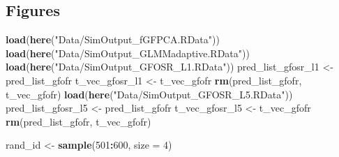 \documentclass[
]{article}
\newenvironment{Shaded}{\begin{snugshade}}{\end{snugshade}}
\newcommand{\AttributeTok}[1]{\textcolor[rgb]{0.13,0.29,0.53}{#1}}
\newcommand{\DecValTok}[1]{\textcolor[rgb]{0.00,0.00,0.81}{#1}}
\newcommand{\FunctionTok}[1]{\textcolor[rgb]{0.13,0.29,0.53}{\textbf{#1}}}
\newcommand{\NormalTok}[1]{#1}
\newcommand{\OtherTok}[1]{\textcolor[rgb]{0.56,0.35,0.01}{#1}}
\newcommand{\SpecialCharTok}[1]{\textcolor[rgb]{0.81,0.36,0.00}{\textbf{#1}}}
\newcommand{\StringTok}[1]{\textcolor[rgb]{0.31,0.60,0.02}{#1}}
\begin{document}
\subsection{Figures}\label{figures}

\begin{Shaded}
\begin{Highlighting}[]
\FunctionTok{load}\NormalTok{(}\FunctionTok{here}\NormalTok{(}\StringTok{"Data/SimOutput\_fGFPCA.RData"}\NormalTok{))}
\FunctionTok{load}\NormalTok{(}\FunctionTok{here}\NormalTok{(}\StringTok{"Data/SimOutput\_GLMMadaptive.RData"}\NormalTok{))}
\FunctionTok{load}\NormalTok{(}\FunctionTok{here}\NormalTok{(}\StringTok{"Data/SimOutput\_GFOSR\_L1.RData"}\NormalTok{))}
\NormalTok{pred\_list\_gfosr\_l1 }\OtherTok{\textless{}{-}}\NormalTok{ pred\_list\_gfofr}
\NormalTok{t\_vec\_gfosr\_l1 }\OtherTok{\textless{}{-}}\NormalTok{ t\_vec\_gfofr}
\FunctionTok{rm}\NormalTok{(pred\_list\_gfofr, t\_vec\_gfofr)}
\FunctionTok{load}\NormalTok{(}\FunctionTok{here}\NormalTok{(}\StringTok{"Data/SimOutput\_GFOSR\_L5.RData"}\NormalTok{))}
\NormalTok{pred\_list\_gfosr\_l5 }\OtherTok{\textless{}{-}}\NormalTok{ pred\_list\_gfofr}
\NormalTok{t\_vec\_gfosr\_l5 }\OtherTok{\textless{}{-}}\NormalTok{ t\_vec\_gfofr}
\FunctionTok{rm}\NormalTok{(pred\_list\_gfofr, t\_vec\_gfofr)}

\NormalTok{rand\_id }\OtherTok{\textless{}{-}} \FunctionTok{sample}\NormalTok{(}\DecValTok{501}\SpecialCharTok{:}\DecValTok{600}\NormalTok{, }\AttributeTok{size =} \DecValTok{4}\NormalTok{)}
\end{Highlighting}
\end{Shaded}
\end{document}

